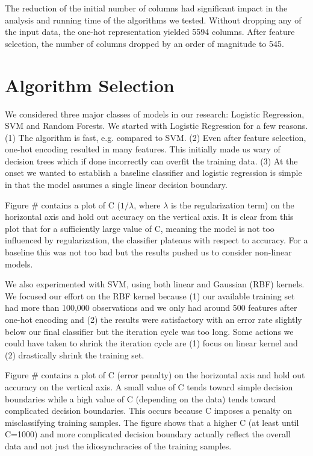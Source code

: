\documentclass[twoside,11pt]{homework}
\begin{document}
The reduction of the initial number of columns had significant impact in the analysis and running time of the algorithms we tested. Without dropping any of the input data, the one-hot representation yielded 5594 columns. After feature selection, the number of columns dropped by an order of magnitude to 545.  


\section*{Algorithm Selection}



We considered three major classes of models in our research: Logistic Regression,
SVM and Random Forests. We started with Logistic Regression for a few reasons.
(1) The algorithm is fast, e.g. compared to SVM.
(2) Even after feature selection, one-hot encoding resulted in 
many features. This initially made us wary of decision trees which if done 
incorrectly can overfit the training data.
(3) At the onset we wanted to establish a baseline classifier and logistic regression is simple in that the model assumes a single linear 
decision boundary. 

Figure \# contains a plot of C ($1/\lambda$, where $\lambda$ is the regularization term) on the horizontal axis and hold out accuracy on the vertical axis.
It is clear from this plot that for a sufficiently large value of C, meaning the model is not too influenced by regularization,
the classifier plateaus with respect to accuracy. For a baseline this was not too bad but the results pushed us
to consider non-linear models. 

We also experimented with SVM, using both linear and Gaussian (RBF) kernels. We 
focused our effort on the RBF kernel because (1) our available training set had more 
than 100,000 observations and we only had around 500 features after one-hot 
encoding and (2) the results were satisfactory with an error rate slightly below 
our final classifier but the iteration cycle was too long. Some actions we could have 
taken to shrink the iteration cycle are (1) focus on linear kernel and (2) drastically 
shrink the training set.

Figure \# contains a plot of C (error penalty) on the horizontal axis and hold out accuracy on the vertical axis.
A small value of C tends toward simple decision boundaries while a high value of C (depending on the data) tends toward complicated
decision boundaries. This occurs because C imposes a penalty on misclassifying training samples.
The figure shows that a higher C (at least until C=1000) and more complicated decision boundary actually reflect the overall data
and not just the idiosynchracies of the training samples.
\end{document}
